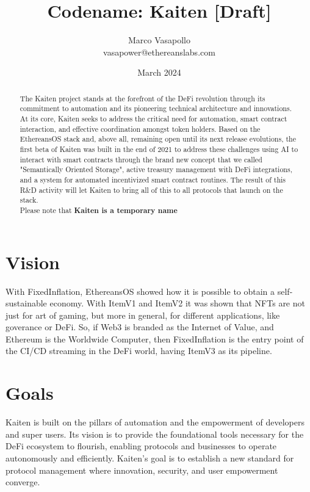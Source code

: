 \documentclass[11pt,oneside,a4paper]{article}
\title{Codename: Kaiten [Draft]}
\author{
         Marco Vasapollo \\ {vasapower@ethereanslabs.com}
}
\date{March 2024}
\begin{document}
\maketitle

\begin{abstract}
The Kaiten project stands at the forefront of the DeFi revolution through its commitment to automation and its pioneering technical architecture and innovations. At its core, Kaiten seeks to address the critical need for automation, smart contract interaction, and effective coordination amongst token holders. Based on the EthereansOS stack and, above all, remaining open until its next release evolutions, the first beta of Kaiten was built in the end of 2021 to address these challenges using AI to interact with smart contracts through the brand new concept that we called "Semantically Oriented Storage", active treasury management with DeFi integrations, and a system for automated incentivized smart contract routines. The result of this R\&D activity will let Kaiten to bring all of this to all protocols that launch on the stack.
\\ Please note that \textbf{Kaiten is a temporary name}
\end{abstract}

\pagebreak
\tableofcontents
\pagebreak

\section{Vision}
With FixedInflation, EthereansOS showed how it is possible to obtain a self-sustainable economy.
With ItemV1 and ItemV2 it was shown that NFTs are not just for art of gaming, but more in general, for different applications, like goverance or DeFi.
So, if Web3 is branded as the Internet of Value, and Ethereum is the Worldwide Computer, then FixedInflation is the entry point of the CI/CD streaming in the DeFi world, having ItemV3 as its pipeline.

\section{Goals}
Kaiten is built on the pillars of automation and the empowerment of developers and super users. Its vision is to provide the foundational tools necessary for the DeFi ecosystem to flourish, enabling protocols and businesses to operate autonomously and efficiently. Kaiten's goal is to establish a new standard for protocol management where innovation, security, and user empowerment converge.
\end{document}
